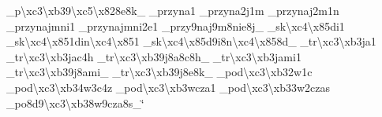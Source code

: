 \begin{DoxyCompactItemize}
\-\_\-p\textbackslash{}xc3\textbackslash{}xb39\textbackslash{}xc5\textbackslash{}x828e8k\-\_\- \-\_\-przyna1 \-\_\-przyna2j1m \-\_\-przynaj2m1n \-\_\-przynajmni1 \-\_\-przynajmni2e1 \-\_\-przy9naj9m8nie8j\-\_\- \-\_\-sk\textbackslash{}xc4\textbackslash{}x85di1 \-\_\-sk\textbackslash{}xc4\textbackslash{}x851din\textbackslash{}xc4\textbackslash{}x851 \-\_\-sk\textbackslash{}xc4\textbackslash{}x85d9i8n\textbackslash{}xc4\textbackslash{}x858d\-\_\- \-\_\-tr\textbackslash{}xc3\textbackslash{}xb3ja1 \-\_\-tr\textbackslash{}xc3\textbackslash{}xb3jac4h \-\_\-tr\textbackslash{}xc3\textbackslash{}xb39j8a8c8h\-\_\- \-\_\-tr\textbackslash{}xc3\textbackslash{}xb3jami1 \-\_\-tr\textbackslash{}xc3\textbackslash{}xb39j8ami\-\_\- \-\_\-tr\textbackslash{}xc3\textbackslash{}xb39j8e8k\-\_\- \-\_\-pod\textbackslash{}xc3\textbackslash{}xb32w1c \-\_\-pod\textbackslash{}xc3\textbackslash{}xb34w3c4z \-\_\-pod\textbackslash{}xc3\textbackslash{}xb3wcza1 \-\_\-pod\textbackslash{}xc3\textbackslash{}xb33w2czas \-\_\-po8d9\textbackslash{}xc3\textbackslash{}xb38w9cza8s\-\_\-\char`\"{}
\end{DoxyCompactItemize}


